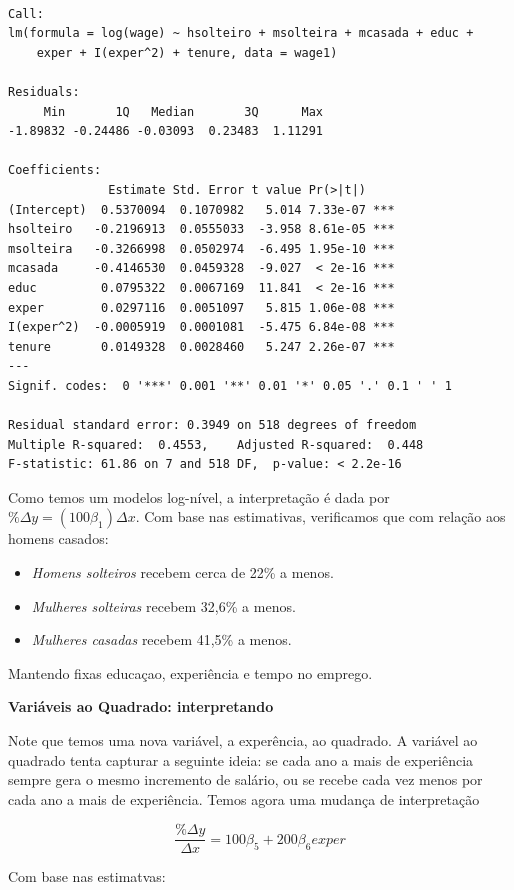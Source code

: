 \documentclass[
  letterpaper,
  DIV=11,
  numbers=noendperiod]{scrreprt}
\providecommand{\tightlist}{%
  \setlength{\itemsep}{0pt}\setlength{\parskip}{0pt}}
\begin{document}
\begin{verbatim}

Call:
lm(formula = log(wage) ~ hsolteiro + msolteira + mcasada + educ + 
    exper + I(exper^2) + tenure, data = wage1)

Residuals:
     Min       1Q   Median       3Q      Max 
-1.89832 -0.24486 -0.03093  0.23483  1.11291 

Coefficients:
              Estimate Std. Error t value Pr(>|t|)    
(Intercept)  0.5370094  0.1070982   5.014 7.33e-07 ***
hsolteiro   -0.2196913  0.0555033  -3.958 8.61e-05 ***
msolteira   -0.3266998  0.0502974  -6.495 1.95e-10 ***
mcasada     -0.4146530  0.0459328  -9.027  < 2e-16 ***
educ         0.0795322  0.0067169  11.841  < 2e-16 ***
exper        0.0297116  0.0051097   5.815 1.06e-08 ***
I(exper^2)  -0.0005919  0.0001081  -5.475 6.84e-08 ***
tenure       0.0149328  0.0028460   5.247 2.26e-07 ***
---
Signif. codes:  0 '***' 0.001 '**' 0.01 '*' 0.05 '.' 0.1 ' ' 1

Residual standard error: 0.3949 on 518 degrees of freedom
Multiple R-squared:  0.4553,    Adjusted R-squared:  0.448 
F-statistic: 61.86 on 7 and 518 DF,  p-value: < 2.2e-16
\end{verbatim}

Como temos um modelos log-nível, a interpretação é dada por
\(\% \Delta y = (100 \beta_1) \Delta x\). Com base nas estimativas,
verificamos que com relação aos homens casados:

\begin{itemize}
\tightlist
\item
  \emph{Homens solteiros} recebem cerca de 22\% a menos.
\item
  \emph{Mulheres solteiras} recebem 32,6\% a menos.
\item
  \emph{Mulheres casadas} recebem 41,5\% a menos.
\end{itemize}

Mantendo fixas educaçao, experiência e tempo no emprego.

\textbf{Variáveis ao Quadrado: interpretando}

Note que temos uma nova variável, a experência, ao quadrado. A variável
ao quadrado tenta capturar a seguinte ideia: se cada ano a mais de
experiência sempre gera o mesmo incremento de salário, ou se recebe cada
vez menos por cada ano a mais de experiência. Temos agora uma mudança de
interpretação

\[\frac{\% \Delta y }{\Delta x}= 100\beta_5 +200\beta_6exper  \]

Com base nas estimatvas:
\end{document}
